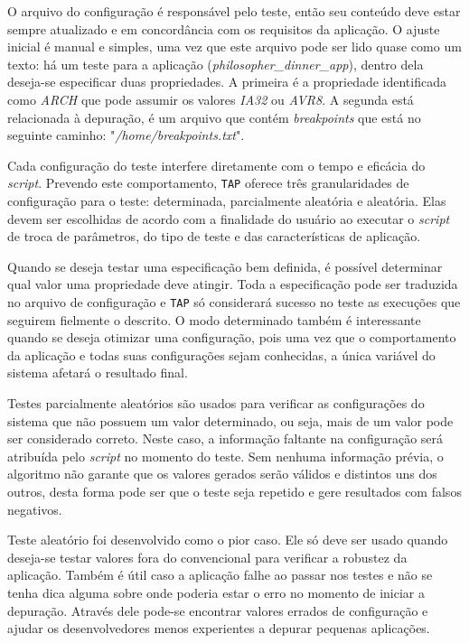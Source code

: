 \documentclass[conference]{IEEEtran}
\begin{document}
O arquivo do configuração é responsável pelo teste, então seu conteúdo deve estar sempre atualizado e em concordância com os requisitos da aplicação. O ajuste inicial é manual e simples, uma vez que este arquivo pode ser lido quase como um texto: há um teste para a aplicação (\textit{philosopher\_dinner\_app}), dentro dela deseja-se especificar duas propriedades. A primeira é a propriedade identificada como \textit{ARCH} que pode assumir os valores \textit{IA32} ou \textit{AVR8}. A segunda está relacionada à depuração, é um arquivo que contém \textit{breakpoints} que está no seguinte caminho: "\textit{/home/breakpoints.txt}".

Cada configuração do teste interfere diretamente com o tempo e eficácia do \textit{script}. Prevendo este comportamento, \texttt{TAP} oferece três granularidades de configuração para o teste: determinada, parcialmente aleatória e aleatória. Elas devem ser escolhidas de acordo com a finalidade do usuário ao executar o \textit{script} de troca de parâmetros, do tipo de teste e das características de aplicação.

Quando se deseja testar uma especificação bem definida, é possível determinar qual valor uma propriedade deve atingir. Toda a especificação pode ser traduzida no arquivo de configuração e \texttt{TAP} só considerará sucesso no teste as execuções que seguirem fielmente o descrito. O modo determinado também é interessante quando se deseja otimizar uma configuração, pois uma vez que o comportamento da aplicação e todas suas configurações sejam conhecidas, a única variável do sistema afetará o resultado final.

Testes parcialmente aleatórios são usados para verificar as configurações do sistema que não possuem um valor determinado, ou seja, mais de um valor pode ser considerado correto. Neste caso, a informação faltante na configuração será atribuída pelo \textit{script} no momento do teste. Sem nenhuma informação prévia, o algoritmo não garante que os valores gerados serão válidos e distintos uns dos outros, desta forma pode ser que o teste seja repetido e gere resultados com falsos negativos.

Teste aleatório foi desenvolvido como o pior caso. Ele só deve ser usado quando deseja-se testar valores fora do convencional para verificar a robustez da aplicação. Também é útil caso a aplicação falhe ao passar nos testes e não se tenha dica alguma sobre onde poderia estar o erro no momento de iniciar a depuração. Através dele pode-se encontrar valores errados de configuração e ajudar os desenvolvedores menos experientes a depurar pequenas aplicações.
\end{document}
